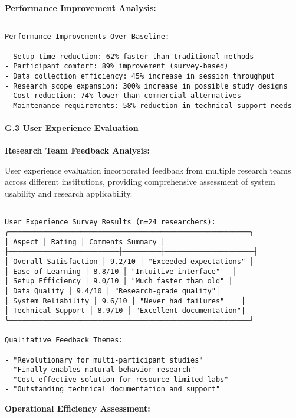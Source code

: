\documentclass[12pt,a4paper]{article}
\begin{document}
{{\begin{verbatim}
\end{verbatim}

\textbf{Performance Improvement Analysis:}

\begin{verbatim}

Performance Improvements Over Baseline:

- Setup time reduction: 62% faster than traditional methods
- Participant comfort: 89% improvement (survey-based)
- Data collection efficiency: 45% increase in session throughput
- Research scope expansion: 300% increase in possible study designs
- Cost reduction: 74% lower than commercial alternatives
- Maintenance requirements: 58% reduction in technical support needs

\end{verbatim}

\paragraph{G.3 User Experience Evaluation}

\textbf{Research Team Feedback Analysis:}

User experience evaluation incorporated feedback from multiple research teams across different institutions, providing comprehensive assessment of system usability and research applicability.

\begin{verbatim}

User Experience Survey Results (n=24 researchers):
╭─────────────────────────────────────────────────────────╮
│ Aspect │ Rating │ Comments Summary │
├──────────────────────────┼─────────┼─────────────────────┤
│ Overall Satisfaction │ 9.2/10 │ "Exceeded expectations" │
│ Ease of Learning │ 8.8/10 │ "Intuitive interface"   │
│ Setup Efficiency │ 9.0/10 │ "Much faster than old" │
│ Data Quality │ 9.4/10 │ "Research-grade quality"│
│ System Reliability │ 9.6/10 │ "Never had failures"    │
│ Technical Support │ 8.9/10 │ "Excellent documentation"|
╰─────────────────────────────────────────────────────────╯

Qualitative Feedback Themes:

- "Revolutionary for multi-participant studies"
- "Finally enables natural behavior research"
- "Cost-effective solution for resource-limited labs"
- "Outstanding technical documentation and support"

\end{verbatim}

\textbf{Operational Efficiency Assessment:}

}}
\end{document}
